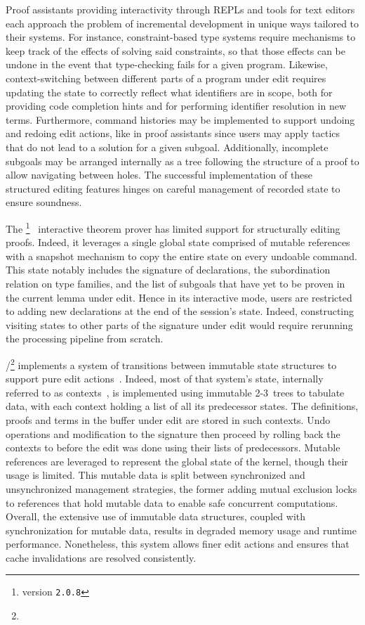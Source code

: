 Proof assistants providing interactivity through \acp{REPL} and tools for text editors each approach the problem of incremental development in unique ways tailored to their systems.
For instance, constraint-based type systems require mechanisms to keep track of the effects of solving said constraints, so that those effects can be undone in the event that type-checking fails for a given program.
Likewise, context-switching between different parts of a program under edit requires updating the state to correctly reflect what identifiers are in scope, both for providing code completion hints and for performing identifier resolution in new terms.
Furthermore, command histories may be implemented to support undoing and redoing edit actions, like in proof assistants since users may apply tactics that do not lead to a solution for a given subgoal.
Additionally, incomplete subgoals may be arranged internally as a tree following the structure of a proof to allow navigating between holes.
The successful implementation of these structured editing features hinges on careful management of recorded state to ensure soundness.

The \Abella\footnote{\Abella version \texttt{2.0.8}}~\cite{baelde2014abella} interactive theorem prover has limited support for structurally editing proofs.
Indeed, it leverages a single global state comprised of mutable references with a snapshot mechanism to copy the entire state on every undoable command.
This state notably includes the signature of declarations, the subordination relation on type families, and the list of subgoals that have yet to be proven in the current lemma under edit.
Hence in its interactive mode, \Abella users are restricted to adding new declarations at the end of the session's state.
Indeed, constructing visiting states to other parts of the signature under edit would require rerunning the processing pipeline from scratch.

\Isabelle/\Isar\footnote{} implements a system of transitions between immutable state structures to support pure edit actions~\cite{wenzel2023isabelleimpl, wenzel2023isabelleisarref, wenzel2023isabellesys}.
Indeed, most of that system's state, internally referred to as contexts~\cite{ballarin2006interpretation}, is implemented using immutable 2-3~trees to tabulate data, with each context holding a list of all its predecessor states.
The definitions, proofs and terms in the buffer under edit are stored in such contexts.
Undo operations and modification to the signature then proceed by rolling back the contexts to before the edit was done using their lists of predecessors.
Mutable references are leveraged to represent the global state of the kernel, though their usage is limited.
This mutable data is split between synchronized and unsynchronized management strategies, the former adding mutual exclusion locks to references that hold mutable data to enable safe concurrent computations.
Overall, the extensive use of immutable data structures, coupled with synchronization for mutable data, results in degraded memory usage and runtime performance.
Nonetheless, this system allows finer edit actions and ensures that cache invalidations are resolved consistently.

